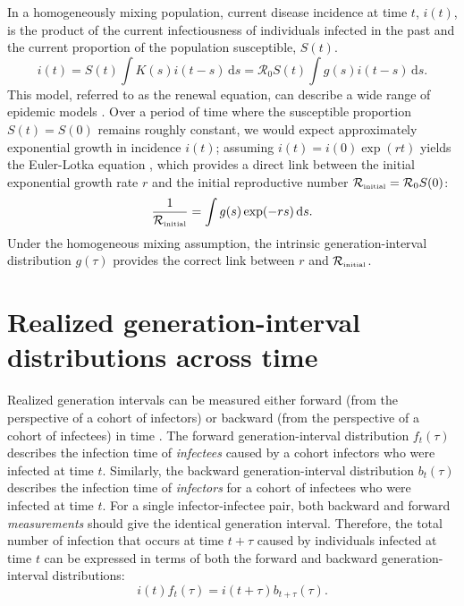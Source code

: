 \documentclass[12pt]{article}
\newcommand{\Rx}[1]{\ensuremath{{\mathcal R}_{#1}}\xspace}
\newcommand{\Ro}{\Rx{0}}
\newcommand{\RR}{\ensuremath{{\mathcal R}}}
\newcommand{\Rini}{\Rx{\textrm{\tiny initial}}}
\begin{document}
In a homogeneously mixing population, current disease incidence at time $t$, $i(t)$, is the product of the current infectiousness of individuals infected in the past and the current proportion of the population susceptible, $S(t)$.
\begin{equation}
i(t) = S(t) \int K(s) i(t-s)\,\mathrm{d}s = \RR_0 S(t) \int g(s) i(t-s)\,\mathrm{d}s.
\end{equation}
This model, referred to as the renewal equation, can describe a wide range of epidemic models \citep{heesterbeek1996concept, diekmann2000mathematical, roberts2004modelling, aldis2005integral, wallinga2007generation, roberts2007model, Champredon2018equivalence}.
Over a period of time where the susceptible proportion $S(t) = S(0)$ remains roughly constant, we would expect approximately exponential growth in incidence $i(t)$; assuming $i(t) = i(0) \exp(r t)$ yields the Euler-Lotka equation \citep{lotka1907relation}, which provides a direct link between the initial exponential growth rate $r$ and the initial reproductive number $\Rini = \Ro S(0)$:
\begin{equation}
\frac{1}{\Rini} = \int g(s) \exp(-r s)\,\mathrm{d}s.
\label{eq:euler}
\end{equation}
Under the homogeneous mixing assumption, the intrinsic generation-interval distribution $g(\tau)$ provides the correct link between $r$ and $\Rini$.

\section{Realized generation-interval distributions across time}

Realized generation intervals can be measured either forward (from the perspective of a cohort of infectors) or backward (from the perspective of a cohort of infectees) in time \citep{champredon2015intrinsic, britton2019estimation}.
The forward generation-interval distribution $f_t(\tau)$ describes the infection time of \emph{infectees} caused by a cohort infectors who were infected at time $t$.
Similarly, the backward generation-interval distribution $b_t(\tau)$ describes the infection time of \emph{infectors} for a cohort of infectees who were infected at time $t$.
For a single infector-infectee pair, both backward and forward \emph{measurements} should give the identical generation interval.
Therefore, the total number of infection that occurs at time $t + \tau$ caused by individuals infected at time $t$ can be expressed in terms of both the forward and backward generation-interval distributions:
\begin{equation}
i(t) f_t(\tau) = i(t+\tau) b_{t+\tau}(\tau).
\label{eq:equivalence}
\end{equation}
\end{document}
